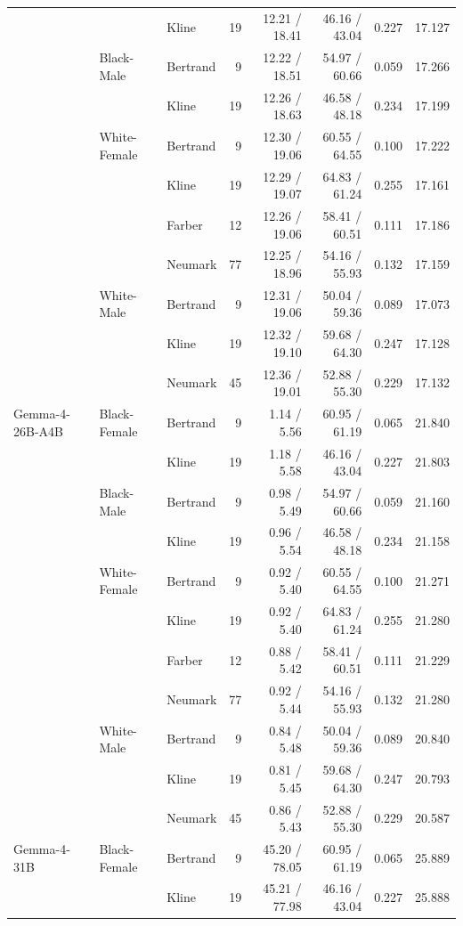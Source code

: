 \begin{longtable}{@{}lllrrrrr@{}}
 &  & Kline & 19 & 12.21 / 18.41 & 46.16 / 43.04 & 0.227 & 17.127 \\
 & Black-Male & Bertrand & 9 & 12.22 / 18.51 & 54.97 / 60.66 & 0.059 & 17.266 \\
 &  & Kline & 19 & 12.26 / 18.63 & 46.58 / 48.18 & 0.234 & 17.199 \\
 & White-Female & Bertrand & 9 & 12.30 / 19.06 & 60.55 / 64.55 & 0.100 & 17.222 \\
 &  & Kline & 19 & 12.29 / 19.07 & 64.83 / 61.24 & 0.255 & 17.161 \\
 &  & Farber & 12 & 12.26 / 19.06 & 58.41 / 60.51 & 0.111 & 17.186 \\
 &  & Neumark & 77 & 12.25 / 18.96 & 54.16 / 55.93 & 0.132 & 17.159 \\
 & White-Male & Bertrand & 9 & 12.31 / 19.06 & 50.04 / 59.36 & 0.089 & 17.073 \\
 &  & Kline & 19 & 12.32 / 19.10 & 59.68 / 64.30 & 0.247 & 17.128 \\
 &  & Neumark & 45 & 12.36 / 19.01 & 52.88 / 55.30 & 0.229 & 17.132 \\
\addlinespace
Gemma-4-26B-A4B & Black-Female & Bertrand & 9 & 1.14 / 5.56 & 60.95 / 61.19 & 0.065 & 21.840 \\
 &  & Kline & 19 & 1.18 / 5.58 & 46.16 / 43.04 & 0.227 & 21.803 \\
 & Black-Male & Bertrand & 9 & 0.98 / 5.49 & 54.97 / 60.66 & 0.059 & 21.160 \\
 &  & Kline & 19 & 0.96 / 5.54 & 46.58 / 48.18 & 0.234 & 21.158 \\
 & White-Female & Bertrand & 9 & 0.92 / 5.40 & 60.55 / 64.55 & 0.100 & 21.271 \\
 &  & Kline & 19 & 0.92 / 5.40 & 64.83 / 61.24 & 0.255 & 21.280 \\
 &  & Farber & 12 & 0.88 / 5.42 & 58.41 / 60.51 & 0.111 & 21.229 \\
 &  & Neumark & 77 & 0.92 / 5.44 & 54.16 / 55.93 & 0.132 & 21.280 \\
 & White-Male & Bertrand & 9 & 0.84 / 5.48 & 50.04 / 59.36 & 0.089 & 20.840 \\
 &  & Kline & 19 & 0.81 / 5.45 & 59.68 / 64.30 & 0.247 & 20.793 \\
 &  & Neumark & 45 & 0.86 / 5.43 & 52.88 / 55.30 & 0.229 & 20.587 \\
\addlinespace
Gemma-4-31B & Black-Female & Bertrand & 9 & 45.20 / 78.05 & 60.95 / 61.19 & 0.065 & 25.889 \\
 &  & Kline & 19 & 45.21 / 77.98 & 46.16 / 43.04 & 0.227 & 25.888 \\

\end{longtable}
